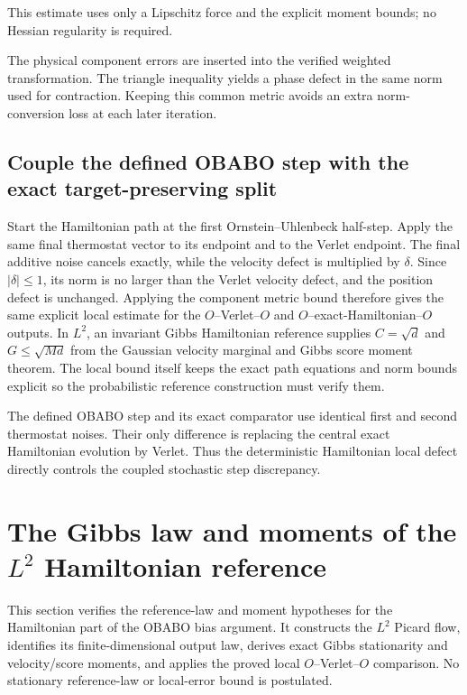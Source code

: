\documentclass[11pt,a4paper]{report}
\begin{document}
This estimate uses only a Lipschitz force and the explicit moment bounds; no Hessian regularity is required.



The physical component errors are inserted into the verified weighted transformation. The triangle inequality yields a phase defect in the same norm used for contraction. Keeping this common metric avoids an extra norm-conversion loss at each later iteration.

\subsection{\texorpdfstring{Couple the defined OBABO step with the exact target-preserving split}{Couple the defined OBABO step with the exact target-preserving split}}
\label{report-step-KineticLangevin-VerletLocal-lean-4}


Start the Hamiltonian path at the first Ornstein–Uhlenbeck half-step. Apply the same final thermostat vector to its endpoint and to the Verlet endpoint. The final additive noise cancels exactly, while the velocity defect is multiplied by \(\delta\). Since \(|\delta|\le1\), its norm is no larger than the Verlet velocity defect, and the position defect is unchanged. Applying the component metric bound therefore gives the same explicit local estimate for the \(O\)–Verlet–\(O\) and \(O\)–exact-Hamiltonian–\(O\) outputs. In \(L^{2}\), an invariant Gibbs Hamiltonian reference supplies \(C=\sqrt d\) and \(G\le\sqrt{Md}\) from the Gaussian velocity marginal and Gibbs score moment theorem. The local bound itself keeps the exact path equations and norm bounds explicit so the probabilistic reference construction must verify them.



The defined OBABO step and its exact comparator use identical first and second thermostat noises. Their only difference is replacing the central exact Hamiltonian evolution by Verlet. Thus the deterministic Hamiltonian local defect directly controls the coupled stochastic step discrepancy.

\section{\texorpdfstring{The Gibbs law and moments of the \(L^{2}\) Hamiltonian reference}{The Gibbs law and moments of the L² Hamiltonian reference}}
\label{proof-module-KineticLangevin-LpHamiltonianLaw-lean}


This section verifies the reference-law and moment hypotheses for the Hamiltonian part of the OBABO bias argument. It constructs the \(L^{2}\) Picard flow, identifies its finite-dimensional output law, derives exact Gibbs stationarity and velocity/\allowbreak{}score moments, and applies the proved local \(O\)–Verlet–\(O\) comparison. No stationary reference-law or local-error bound is postulated.
\end{document}
